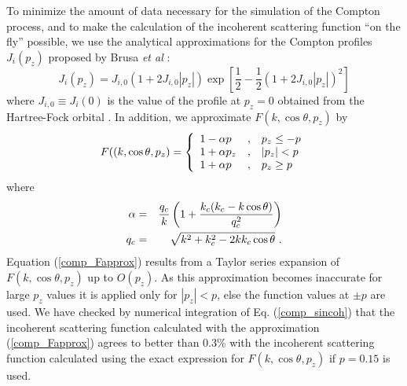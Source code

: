 To minimize the amount of data necessary for
the simulation of the Compton process, and to make
the calculation of the incoherent scattering function ``on the fly''
possible, we use
the analytical approximations for the Compton profiles
$J_i(p_z)$ proposed by Brusa {\em et al} \cite{BS96}:
\begin{equation}
\label{comp_Japprox}
J_i(p_z) = J_{i,0} (1 + 2 J_{i,0} |p_z| ) \exp\left[\frac{1}{2} -
\frac{1}{2}\left(1 + 2 J_{i,0} |p_z| \right)^2\right]
\end{equation}
where $J_{i,0} \equiv J_i(0)$ is the value of the profile at
$p_z = 0$ obtained from the Hartree-Fock orbital \cite{BM75}.
In addition, we approximate $F(k,\cos \theta, p_z)$ by
\begin{equation}
\label{comp_Fapprox}
F((k,\cos \theta, p_z) = \left\{
\begin{array}{l@{\quad , \quad}l}
1 - \alpha p & p_z \le -p \\
1 + \alpha p_z & |p_z| < p \\
1 + \alpha p & p_z \ge p
\end{array} \right.
\end{equation}
where
\begin{eqnarray}
\label{comp_alpha}
\alpha & = & \frac{q_c}{k} \left(1 +
{k_c (k_c - k \cos \theta) \over q_c^2} \right)
\nonumber \\
q_c & = & \sqrt{k^2 + k_c^2 - 2 k k_c \cos \theta}~.
\end{eqnarray}
Equation (\ref{comp_Fapprox}) results from a Taylor series
expansion of $F(k,\cos \theta, p_z)$ up to $O(p_z)$. As this
approximation becomes inaccurate for large $p_z$ values
it is applied only for $|p_z| < p$, else the function values at
$\pm p$ are used. We have checked by numerical integration
of Eq. (\ref{comp_sincoh}) that the incoherent scattering function
calculated with the approximation (\ref{comp_Fapprox}) agrees
to better than 0.3\% with the incoherent scattering function
calculated using the exact expression for $F(k,\cos \theta, p_z)$
if $p = 0.15$ is used.

